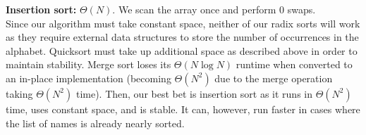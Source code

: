 \begin{parts}
\begin{solution}
\textbf{Insertion sort:} $\Theta(N)$. We scan the array once and perform 0 swaps.
\\
Since our algorithm must take constant space, neither of our radix sorts
will work as they require external data structures to store the number of
occurrences in the alphabet. Quicksort must take up additional space
as described above in order to maintain stability. Merge sort loses
its $\Theta(N \log N)$ runtime when converted to an in-place implementation
(becoming $\Theta(N^2)$ due to the merge operation taking $\Theta(N^2)$ time).
Then, our best bet is insertion sort as it runs in $\Theta(N^2)$ time, uses
constant space, and is stable. It can, however, run faster in cases where
the list of names is already nearly sorted.
\end{solution}

\end{parts}
